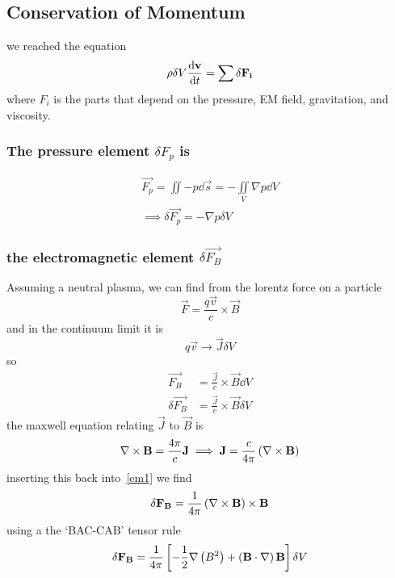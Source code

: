 \subsection{Conservation of Momentum}
we reached the equation
\begin{equation}\label{alltheforces}
    \rho\delta V \diff{\vec{v}}{t} = \sum \delta \vec{F_i}
\end{equation}
where \(F_i\) is the parts that depend on the pressure, EM field, gravitation, and viscosity. 
\subsubsection{The pressure element \(\delta F_p\) is}
\begin{align}
    \vec{F_p} = \iint -p\dd \vec{s} = -\iint\limits_V \nabla p \dd V\\
    \implies \delta \vec{F_p} = -\nabla p\delta V
\end{align}
\subsubsection{the electromagnetic element \(\delta\vec{F_B}\)} Assuming a neutral plasma, we can find from the lorentz force on a particle
\begin{equation}
    \vec{F} = \frac{q\vec{v}}{c}\times\vec{B}
\end{equation}
and in the continuum limit it is
\begin{equation}
    q\vec{v} \rightarrow \vec{J}\delta V
\end{equation}
so
\begin{align}
    \vec{F_B} &= \frac{\vec{J}}{c}\times \vec{B} \dd V\\
    \delta\vec{F_B} &= \frac{\vec{J}}{c}\times \vec{B}\delta V \label{em1}
\end{align}
the maxwell equation relating \(\vec{J}\) to \(\vec{B}\) is
\begin{equation}
    \nabla\times\mathbf{B} = \frac{4\pi}{c}\mathbf{J} \implies \mathbf{J} = \frac{c}{4\pi}\left(\nabla\times\mathbf{B}\right)
\end{equation}
inserting this back into~\ref{em1} we find
\begin{equation}
    \delta\mathbf{F_B} = \frac{1}{4\pi}\left(\nabla\times\mathbf{B}\right)\times\mathbf{B}
\end{equation}
using a the `BAC-CAB' tensor rule
\begin{equation}
    \delta\mathbf{F_B} = \frac{1}{4\pi}\left[-\frac{1}{2}\nabla\left(B^2\right)+\left(\mathbf{B}\cdot\nabla\right)\mathbf{B}\right]\delta V
\end{equation}
